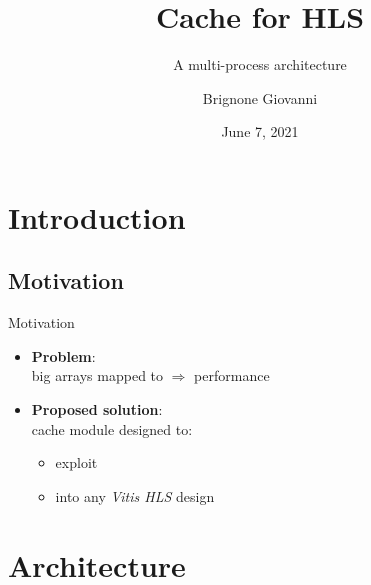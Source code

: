 \documentclass[handout]{beamer}
\title{Cache for HLS}
\subtitle{A multi-process architecture}
\author{Brignone Giovanni}
\date{June 7, 2021}
\begin{document}
\begin{frame}
	\maketitle
\end{frame}

\section{Introduction}
\subsection{Motivation}
\begin{frame}{Motivation}
	\begin{itemize}
		\item \textbf{Problem}:\\
			big arrays mapped to  $\Rightarrow$
			performance 
		\item \textbf{Proposed solution}:\\
			cache module designed to:
			\begin{itemize}
				\item exploit 
				\item {} into any
					\emph{Vitis HLS} design
			\end{itemize}
	\end{itemize}
\end{frame}

\section{Architecture}
\end{document}
